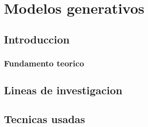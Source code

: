 
\chapter{Modelos generativos} %

\label{Chapter3} %


\section{Introduccion}

\subsection{Fundamento teorico}


\section{Lineas de investigacion}
\section{Tecnicas usadas}
